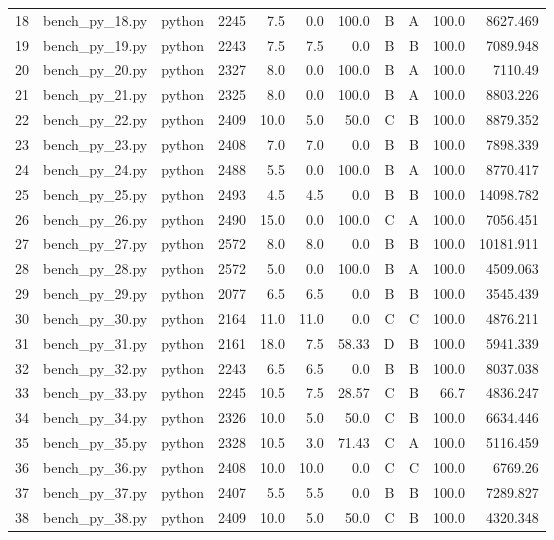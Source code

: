 \begin{table}[htbp]
\begin{tabular}{lrrrrrrrrrr}
18 & bench\_py\_18.py & python & 2245 & 7.5 & 0.0 & 100.0 & B & A & 100.0 & 8627.469 \\
19 & bench\_py\_19.py & python & 2243 & 7.5 & 7.5 & 0.0 & B & B & 100.0 & 7089.948 \\
20 & bench\_py\_20.py & python & 2327 & 8.0 & 0.0 & 100.0 & B & A & 100.0 & 7110.49 \\
21 & bench\_py\_21.py & python & 2325 & 8.0 & 0.0 & 100.0 & B & A & 100.0 & 8803.226 \\
22 & bench\_py\_22.py & python & 2409 & 10.0 & 5.0 & 50.0 & C & B & 100.0 & 8879.352 \\
23 & bench\_py\_23.py & python & 2408 & 7.0 & 7.0 & 0.0 & B & B & 100.0 & 7898.339 \\
24 & bench\_py\_24.py & python & 2488 & 5.5 & 0.0 & 100.0 & B & A & 100.0 & 8770.417 \\
25 & bench\_py\_25.py & python & 2493 & 4.5 & 4.5 & 0.0 & B & B & 100.0 & 14098.782 \\
26 & bench\_py\_26.py & python & 2490 & 15.0 & 0.0 & 100.0 & C & A & 100.0 & 7056.451 \\
27 & bench\_py\_27.py & python & 2572 & 8.0 & 8.0 & 0.0 & B & B & 100.0 & 10181.911 \\
28 & bench\_py\_28.py & python & 2572 & 5.0 & 0.0 & 100.0 & B & A & 100.0 & 4509.063 \\
29 & bench\_py\_29.py & python & 2077 & 6.5 & 6.5 & 0.0 & B & B & 100.0 & 3545.439 \\
30 & bench\_py\_30.py & python & 2164 & 11.0 & 11.0 & 0.0 & C & C & 100.0 & 4876.211 \\
31 & bench\_py\_31.py & python & 2161 & 18.0 & 7.5 & 58.33 & D & B & 100.0 & 5941.339 \\
32 & bench\_py\_32.py & python & 2243 & 6.5 & 6.5 & 0.0 & B & B & 100.0 & 8037.038 \\
33 & bench\_py\_33.py & python & 2245 & 10.5 & 7.5 & 28.57 & C & B & 66.7 & 4836.247 \\
34 & bench\_py\_34.py & python & 2326 & 10.0 & 5.0 & 50.0 & C & B & 100.0 & 6634.446 \\
35 & bench\_py\_35.py & python & 2328 & 10.5 & 3.0 & 71.43 & C & A & 100.0 & 5116.459 \\
36 & bench\_py\_36.py & python & 2408 & 10.0 & 10.0 & 0.0 & C & C & 100.0 & 6769.26 \\
37 & bench\_py\_37.py & python & 2407 & 5.5 & 5.5 & 0.0 & B & B & 100.0 & 7289.827 \\
38 & bench\_py\_38.py & python & 2409 & 10.0 & 5.0 & 50.0 & C & B & 100.0 & 4320.348 \\

\end{tabular}
\end{table}

